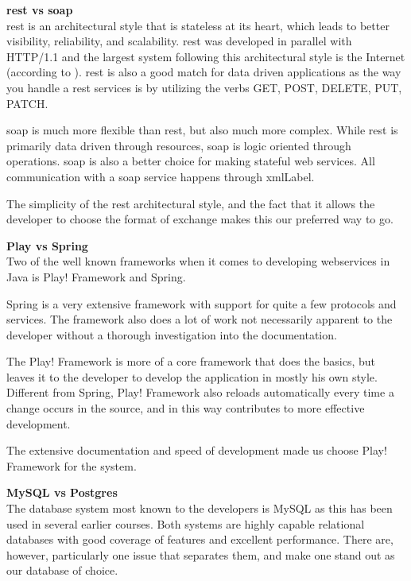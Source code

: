 \documentclass[11pt]{book}
\begin{document}
\textbf{\gls{rest} vs \gls{soap}}\\
\gls{rest} \cite{rest} is an architectural style that is stateless at its heart, which leads to better visibility, reliability, and scalability. \gls{rest} was developed in parallel with HTTP/1.1 and the largest system following this architectural style is the Internet (according to \cite{wikipedia:rest}). \gls{rest} is also a good match for data driven applications as the way you handle a \gls{rest} services is by utilizing the verbs GET, POST, DELETE, PUT, PATCH.

\gls{soap} is much more flexible than \gls{rest}, but also much more complex. While \gls{rest} is primarily data driven through resources, \gls{soap} is logic oriented through operations. \gls{soap} is also a better choice for making stateful web services. All communication with a \gls{soap} service happens through \gls{xmlLabel}.

The simplicity of the \gls{rest} architectural style, and the fact that it allows the developer to choose the format of exchange makes this our preferred way to go.

\textbf{Play vs Spring}\\
Two of the well known frameworks when it comes to developing webservices in Java is Play! Framework and Spring. %

Spring is a very extensive framework with support for quite a few protocols and services. The framework also does a lot of work not necessarily apparent to the developer without a thorough investigation into the documentation.

The Play! Framework is more of a core framework that does the basics, but leaves it to the developer to develop the application in mostly his own style. Different from Spring, Play! Framework also reloads automatically every time a change occurs in the source, and in this way contributes to more effective development.

The extensive documentation and speed of development made us choose Play! Framework for the system.

\textbf{MySQL vs Postgres}\\
The database system most known to the developers is MySQL as this has been used in several earlier courses. Both systems are highly capable relational databases with good coverage of features and excellent performance. There are, however, particularly one issue that separates them, and make one stand out as our database of choice.
\end{document}
